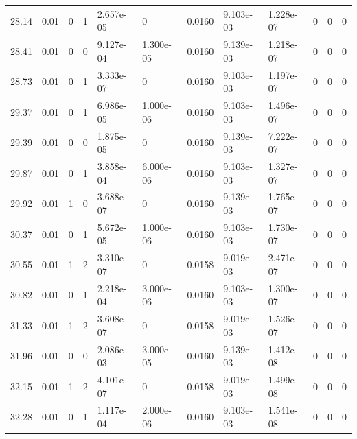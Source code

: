 \documentclass[preview]{standalone}
\begin{document}
{{{\begin{tabular}{L{1.2cm}C{1.2cm} C{0.3cm}C{0.5cm} C{1.4cm}C{1.4cm} C{1.4cm}C{1.4cm} C{1.6cm}C{1.6cm} C{1.6cm}C{1.6cm}}
  28.14  &  0.01  & 0     &  1 &  2.657e-05  & 0  &  0.0160&   9.103e-03& 1.228e-07 & 0   &  0 & 0  \\ 
  28.41  &  0.01  & 0     &  0 &  9.127e-04  & 1.300e-05  &  0.0160&   9.139e-03& 1.218e-07 & 0   &  0 & 0  \\ 
  28.73  &  0.01  & 0     &  1 &  3.333e-07  & 0  &  0.0160&   9.103e-03& 1.197e-07 & 0   &  0 & 0  \\ 
  29.37  &  0.01  & 0     &  1 &  6.986e-05  & 1.000e-06  &  0.0160&   9.103e-03& 1.496e-07 & 0   &  0 & 0  \\ 
  29.39  &  0.01  & 0     &  0 &  1.875e-05  & 0  &  0.0160&   9.139e-03& 7.222e-07 & 0   &  0 & 0  \\ 
  29.87  &  0.01  & 0     &  1 &  3.858e-04  & 6.000e-06  &  0.0160&   9.103e-03& 1.327e-07 & 0   &  0 & 0  \\ 
  29.92  &  0.01  & 1     &  0 &  3.688e-07  & 0  &  0.0160&   9.139e-03& 1.765e-07 & 0   &  0 & 0  \\ 
  30.37  &  0.01  & 0     &  1 &  5.672e-05  & 1.000e-06  &  0.0160&   9.103e-03& 1.730e-07 & 0   &  0 & 0  \\ 
  30.55  &  0.01  & 1     &  2 &  3.310e-07  & 0  &  0.0158&   9.019e-03& 2.471e-07 & 0   &  0 & 0  \\ 
  30.82  &  0.01  & 0     &  1 &  2.218e-04  & 3.000e-06  &  0.0160&   9.103e-03& 1.300e-07 & 0   &  0 & 0  \\ 
  31.33  &  0.01  & 1     &  2 &  3.608e-07  & 0  &  0.0158&   9.019e-03& 1.526e-07 & 0   &  0 & 0  \\ 
  31.96  &  0.01  & 0     &  0 &  2.086e-03  & 3.000e-05  &  0.0160&   9.139e-03& 1.412e-08 & 0   &  0 & 0  \\ 
  32.15  &  0.01  & 1     &  2 &  4.101e-07  & 0  &  0.0158&   9.019e-03& 1.499e-08 & 0   &  0 & 0  \\ 
  32.28  &  0.01  & 0     &  1 &  1.117e-04  & 2.000e-06  &  0.0160&   9.103e-03& 1.541e-08 & 0   &  0 & 0  \\ 
\hline 
\end{tabular} 

}}}
\end{document}
